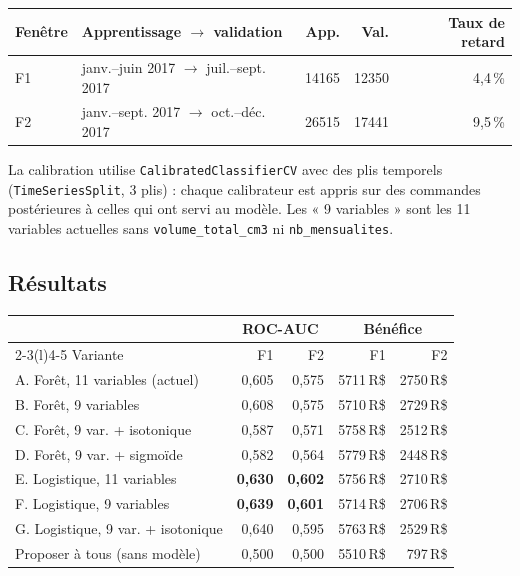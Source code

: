 \documentclass[11pt,a4paper]{article}
\newcommand{\RS}{\,R\$}
\newcommand{\var}[1]{\texttt{#1}}
\begin{document}
\begin{center}
\begin{tabular}{@{}llrrr@{}}
\toprule
Fenêtre & Apprentissage $\rightarrow$ validation & App. & Val. & Taux de retard \\
\midrule
F1 & janv.–juin 2017 $\rightarrow$ juil.–sept. 2017 & \num{14165} & \num{12350} & 4,4\,\% \\
F2 & janv.–sept. 2017 $\rightarrow$ oct.–déc. 2017 & \num{26515} & \num{17441} & 9,5\,\% \\
\bottomrule
\end{tabular}
\end{center}

La calibration utilise \var{CalibratedClassifierCV} avec des plis temporels
(\var{TimeSeriesSplit}, 3 plis) : chaque calibrateur est appris sur des commandes postérieures
à celles qui ont servi au modèle. Les « 9 variables » sont les 11 variables actuelles sans
\var{volume\_total\_cm3} ni \var{nb\_mensualites}.

\subsection{Résultats}

\begin{center}
\begin{tabular}{@{}lrrrr@{}}
\toprule
& \multicolumn{2}{c}{ROC-AUC} & \multicolumn{2}{c}{Bénéfice} \\
\cmidrule(lr){2-3}\cmidrule(l){4-5}
Variante & F1 & F2 & F1 & F2 \\
\midrule
A. Forêt, 11 variables (actuel) & 0,605 & 0,575 & \num{5711}\RS{} & \num{2750}\RS{} \\
B. Forêt, 9 variables & 0,608 & 0,575 & \num{5710}\RS{} & \num{2729}\RS{} \\
C. Forêt, 9 var. + isotonique & 0,587 & 0,571 & \num{5758}\RS{} & \num{2512}\RS{} \\
D. Forêt, 9 var. + sigmoïde & 0,582 & 0,564 & \num{5779}\RS{} & \num{2448}\RS{} \\
E. Logistique, 11 variables & \textbf{0,630} & \textbf{0,602} & \num{5756}\RS{} & \num{2710}\RS{} \\
F. Logistique, 9 variables & \textbf{0,639} & \textbf{0,601} & \num{5714}\RS{} & \num{2706}\RS{} \\
G. Logistique, 9 var. + isotonique & 0,640 & 0,595 & \num{5763}\RS{} & \num{2529}\RS{} \\
\midrule
Proposer à tous (sans modèle) & 0,500 & 0,500 & \num{5510}\RS{} & 797\RS{} \\
\bottomrule
\end{tabular}
\end{center}
\end{document}

